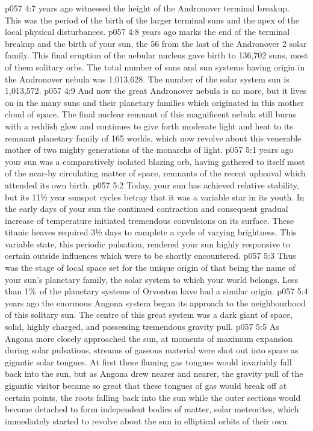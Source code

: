 \vs p057 4:7 \pc {} years ago witnessed the height of the Andronover terminal breakup. This was the period of the birth of the larger terminal suns and the apex of the local physical disturbances.
\vs p057 4:8 \pc {} years ago marks the end of the terminal breakup and the birth of your sun, the 56 from the last of the Andronover 2 solar family. This final eruption of the nebular nucleus gave birth to 136,702 suns, most of them solitary orbs. The total number of suns and sun systems having origin in the Andronover nebula was 1,013,628. The number of the solar system sun is 1,013,572.
\vs p057 4:9 And now the great Andronover nebula is no more, but it lives on in the many suns and their planetary families which originated in this mother cloud of space. The final nuclear remnant of this magnificent nebula still burns with a reddish glow and continues to give forth moderate light and heat to its remnant planetary family of 165 worlds, which now revolve about this venerable mother of two mighty generations of the monarchs of light.
\vs p057 5:1  years ago your sun was a comparatively isolated blazing orb, having gathered to itself most of the near\hyp{}by circulating matter of space, remnants of the recent upheaval which attended its own birth.
\vs p057 5:2 Today, your sun has achieved relative stability, but its 11½ year sunspot cycles betray that it was a variable star in its youth. In the early days of your sun the continued contraction and consequent gradual increase of temperature initiated tremendous convulsions on its surface. These titanic heaves required 3½ days to complete a cycle of varying brightness. This variable state, this periodic pulsation, rendered your sun highly responsive to certain outside influences which were to be shortly encountered.
\vs p057 5:3 Thus was the stage of local space set for the unique origin of  that being the name of your sun’s planetary family, the solar system to which your world belongs. Less than 1\%\ of the planetary systems of Orvonton have had a similar origin.
\vs p057 5:4 \pc {} years ago the enormous Angona system began its approach to the neighbourhood of this solitary sun. The centre of this great system was a dark giant of space, solid, highly charged, and possessing tremendous gravity pull.
\vs p057 5:5 As Angona more closely approached the sun, at moments of maximum expansion during solar pulsations, streams of gaseous material were shot out into space as gigantic solar tongues. At first these flaming gas tongues would invariably fall back into the sun, but as Angona drew nearer and nearer, the gravity pull of the gigantic visitor became so great that these tongues of gas would break off at certain points, the roots falling back into the sun while the outer sections would become detached to form independent bodies of matter, solar meteorites, which immediately started to revolve about the sun in elliptical orbits of their own.
